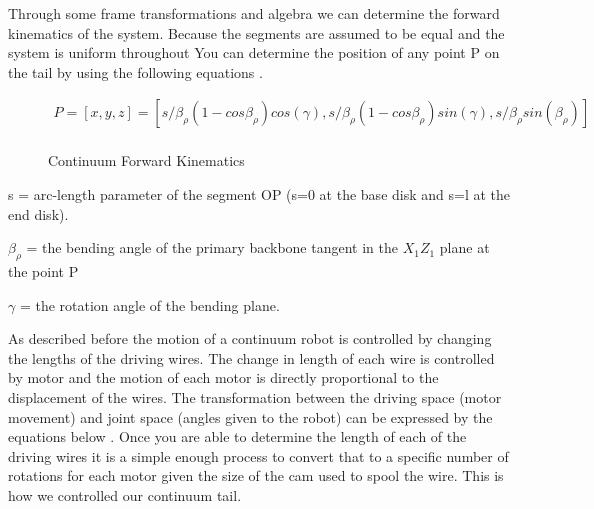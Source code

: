             Through some frame transformations and algebra we can determine the forward kinematics of the system. Because the segments are assumed to be equal and the system is uniform throughout You can determine the position of any point P on the tail by using the following equations \cite{wang_li_xie_shen}.
            
            \begin{figure}[H]
            \centering
            \begin{gather*}
            P = [x,y,z] = [s/\beta_\rho (1 - cos \beta_\rho)cos(\gamma), s/\beta_\rho (1 - cos \beta_\rho)sin(\gamma), s/\beta_\rho sin(\beta_\rho)] \\
            \end{gather*}
            
            \caption{Continuum Forward Kinematics}
            \label{fig:FWKin_Continuum_Tail}
            \end{figure}

            \begin{Deliverables}
                \item s = arc-length parameter of the segment OP (s=0 at the base disk and s=l at the end disk).
                \item $\beta_\rho$ = the bending angle of the primary backbone tangent in the $X_1 Z_1$ plane at the point P
                \item $\gamma$ = the rotation angle of the bending plane.
            \end{Deliverables}
            
            As described before the motion of a continuum robot is controlled by changing the lengths of the driving wires. The change in length of each wire is controlled by motor and the motion of each motor is directly proportional to the displacement of the wires. The transformation between the  driving space (motor movement) and joint space (angles given to the robot) can be expressed by the equations below \cite{wang_li_xie_shen}. Once you are able to determine the length of each of the driving wires it is a simple enough process to convert that to a specific number of rotations for each motor given the size of the cam used to spool the wire. This is how we controlled our continuum tail.
            
